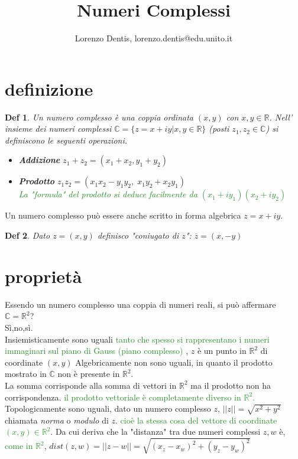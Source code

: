 \documentclass[a4paper]{article}
\newtheorem*{definition}{Def}
\newcommand{\appunto}[1]{\textcolor{ForestGreen}{#1}}
\newcommand{\R}[0]{\mathbb{R}}
\begin{document}
\author{Lorenzo Dentis, lorenzo.dentis@edu.unito.it}
\title{Numeri Complessi}
\maketitle
\section{definizione}
\begin{definition}
	Un numero complesso è una coppia ordinata $ (x,y) $ con $ x,y \in \mathbb{R} $.
	Nell' insieme dei numeri complessi $ \mathbb{C} = \{z = x + iy | x,y \in \mathbb{R}\} $ (posti $z_1,z_2 \in \mathbb{C}$) si definiscono le seguenti operazioni.
	\begin{itemize}
		\item[] \textbf{Addizione} $z_1+z_2 = (x_1+x_2, y_1 + y_2)$
		\item[] \textbf{Prodotto} $z_1z_2 = (x_1x_2 - y_1y_2,\; x_1y_2 + x_2y_1) $\\
			\appunto{La "formula" del prodotto si deduce facilmente da $(x_1 + iy_1) (x_2 + iy_2)$}
	\end{itemize}
\end{definition}
Un numero complesso può essere anche scritto in forma algebrica $z= x+iy$.
\begin{definition}
	Dato $z= (x,y)$ definisco "coniugato di $z$": $\overline z = (x,-y)$
\end{definition}
\section{proprietà}
Essendo un numero complesso una coppia di numeri reali, si può affermare $\mathbb{C} = \mathbb{R}^2$?\\
Sì,no,sì.\\ 
Insiemisticamente sono uguali \appunto{tanto che spesso si rappresentano i numeri immaginari sul piano di Gauss (piano complesso)} , $z$ è un punto in $\R^2$ di coordinate $(x,y)$
Algebricamente non sono uguali, in quanto il prodotto mostrato in $\mathbb{C}$ non è presente in $\mathbb{R}^2$.\\
La somma corrisponde alla somma di vettori in $\R^2$ ma il prodotto non ha corrispondenza.
\appunto{il prodotto vettoriale è  completamente diverso in $\mathbb{R}^2$.}\\
Topologicamente sono uguali, dato un numero complesso $z$, $||z|| = \sqrt{x^2 + y^2}$ chiamata \textit{norma} o \textit{modulo} di $z$. \appunto{cioè la stessa cosa del vettore di coordinate $(x,y) \in \R^2$}.
Da cui deriva che la "distanza" tra due numeri complessi $z,w$ è, \appunto{come in $\R^2$}, $dist(z,w)=||z-w|| = \sqrt{(x_z - x_w)^2 + (y_z - y_w)^2}$
\end{document}
